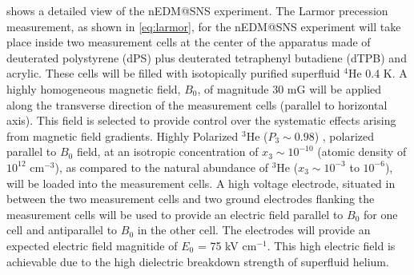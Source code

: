 

 shows a detailed view of the nEDM@SNS experiment. The Larmor precession measurement, as shown in \cref{eq:larmor}, for the nEDM@SNS experiment will take place inside two measurement cells at the center of the apparatus made of deuterated polystyrene (dPS) plus deuterated tetraphenyl butadiene (dTPB) and acrylic. These cells will be filled with isotopically purified superfluid $^4$He 0.4 K. A highly homogeneous magnetic field, $B_0$, of magnitude 30 mG will be applied along the transverse direction of the measurement cells (parallel to horizontal axis). This field is selected to provide control over the systematic effects arising from magnetic field gradients. Highly Polarized $^3$He ($P_3 \sim 0.98$) , polarized parallel to $B_0$ field, at an isotropic concentration of $x_3 \sim 10^{-10}$ (atomic density of $10^{12}$ cm$^{-3}$), as compared to the natural abundance of $^3$He ($x_3 \sim 10^{-3}$ to $10^{-6}$), will be loaded into the measurement cells. A high voltage electrode, situated in between the two measurement cells and two ground electrodes flanking the measurement cells will be used to provide an electric field parallel to $B_0$ for one cell and antiparallel to $B_0$ in the other cell. The electrodes will provide an expected electric field magnitide of $E_0$ = 75 kV cm$^{-1}$. This high electric field is achievable due to the high dielectric breakdown strength of superfluid helium. 

